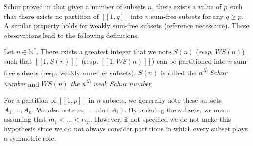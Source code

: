 Schur proved in \cite{Schur1917} that given a number of subsets \(n\), there exists a value of \(p\)
such that there exists no partition of \([\![1,q]\!]\) into \(n\) sum-free subsets for any \(q \geqslant p\). A similar
property holds for weakly sum-free subsets (reference necessaire). These observations lead to the following definitions.
\begin{definition}
Let \(n \in \mathbb{N}^*\). There exists a greatest integer that we note \(S(n)\) (\textit{resp. \(WS(n)\)}) such that
\([\![1,S(n)]\!]\) (resp. \([\![1,WS(n)]\!]\)) can be partitioned into \(n\) sum-free subsets (resp. weakly sum-free
subsets). \(S(n)\) is called the \textit{\(n\)\textsuperscript{th} Schur number} and \textit{\(WS(n)\) the
\(n\)\textsuperscript{th} weak
Schur number}.
\end{definition}

\begin{notation}
For a partition of \([\![1, p]\!]\) in \(n\) subsets, we generally note these subsets \(A_1, ..., A_n\). We also note
\(m_i = \text{min}(A_i)\).
By ordering the subsets, we mean assuming that \(m_1 < ... < m_n\). However, if not specified we do not make this
hypothesis since we
do not always consider partitions in which every subset plays a symmetric role.
\end{notation}